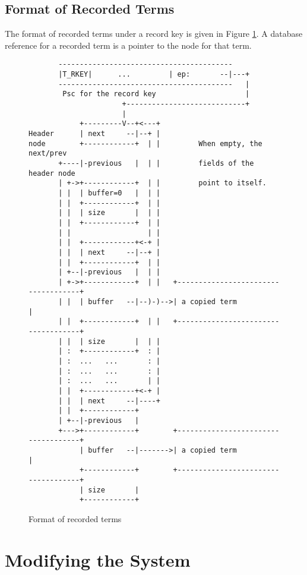 \documentclass[11pt]{article}
\begin{document}
\subsection{Format of Recorded Terms}

The format of recorded terms under a record key is given in Figure
\ref{f:record}.
A database reference for a recorded term
is a pointer to the node for that term.

\begin{figure}
\begin{verbatim}
       -----------------------------------------
       |T_RKEY|      ...         | ep:       --|---+
       -----------------------------------------   |
        Psc for the record key                     |
                      +----------------------------+
                      |
            +---------V--+<---+
Header      | next     --|--+ |
node        +------------+  | |         When empty, the next/prev
       +----|-previous   |  | |         fields of the header node
       | +->+------------+  | |         point to itself.
       | |  | buffer=0   |  | |
       | |  +------------+  | |
       | |  | size       |  | |
       | |  +------------+  | |
       | |                  | |
       | |  +------------+<-+ |
       | |  | next     --|--+ |
       | |  +------------+  | |
       | +--|-previous   |  | |
       | +->+------------+  | |   +------------------------------------+
       | |  | buffer   --|--)-)-->| a copied term                      |
       | |  +------------+  | |   +------------------------------------+
       | |  | size       |  | |
       | :  +------------+  : |
       | :  ...   ...       : |
       | :  ...   ...       : |
       | :  ...   ...       | |
       | |  +------------+<-+ |
       | |  | next     --|----+
       | |  +------------+  
       | +--|-previous   |
       +--->+------------+        +------------------------------------+
            | buffer   --|------->| a copied term                      |
            +------------+        +------------------------------------+
            | size       |
            +------------+  
\end{verbatim}
\caption{Format of recorded terms}
\label{f:record}
\end{figure}


\section{Modifying the System} \label{sec:modification}
\end{document}

